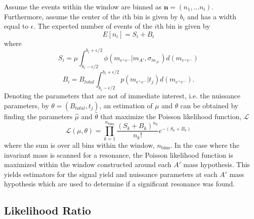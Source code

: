Assume the events within the window are binned as $\mathbf{n} = (n_{1}, ... n_{i})$.
Furthermore, assume the center of the $i$th bin is given by $b_i$ and has a width
equal to $\epsilon$. 
The expected number of events of the $i$th bin is given by 
\begin{equation}
    E[n_i] = S_{i} + B_{i}
\end{equation}
where 
\begin{equation}
    S_{i} = \mu \int_{b_i - \epsilon/2}^{b_i + \epsilon/2} \phi(m_{e^+e^-} | m_{A'}, \sigma_{m_{A'}}) d (m_{e^+e^-})
\end{equation} 
\begin{equation}
    B_{i} = B_{total} \int_{b_i - \epsilon/2}^{b_i + \epsilon/2} p(m_{e^+e^-} | t_{j}) d (m_{e^+e^-}).
\end{equation}
Denoting the parameters that are not of immediate interest, i.e. the nuissance
parameters, by $\theta = (B_{total},  t_{j})$, an estimation
of $\mu$ and $\theta$ can be obtained by finding the parameters $\hat{\mu}$ and
$\hat{\theta}$ that maximize the Poisson likelihood function, $\mathcal{L}$
\begin{equation}
\mathcal{L}(\mu, \theta) = \prod_{k=1}^{n_{\text{bins}}} \frac{(S_{k} + B_{k})^{n_k}}{n_{k}!} e^{-(S_{k} + B_{k})}
\end{equation}
where the sum is over all bins within the window, $n_{\text{bins}}$.
In the case where the invariant mass is scanned for a resonance, the Poisson 
likelihood function is maximized within the window constructed around each
$A'$ mass hypothesis. This yields estimators for the signal yield and nuissance
parameters at each $A'$ mass hypothesis which are used to determine if a significant 
resonance was found.

\subsection{Likelihood Ratio} \label{sub:likelihood_ratio}

